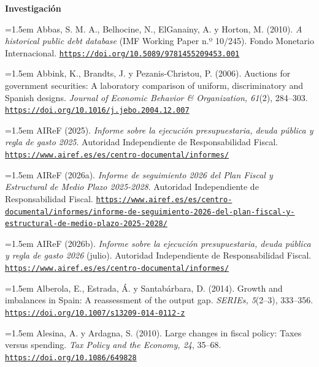 \documentclass[10pt,a4paper]{article}
\begin{document}
\bigskip
{\bfseries\large Investigación\par}
\medskip

\noindent\hangindent=1.5em Abbas, S. M. A., Belhocine, N., ElGanainy, A. y Horton, M. (2010). \textit{A historical public debt database} (IMF Working Paper n.º 10/245). Fondo Monetario Internacional. \href{https://doi.org/10.5089/9781455209453.001}{\nolinkurl{https://doi.org/10.5089/9781455209453.001}}

\noindent\hangindent=1.5em Abbink, K., Brandts, J. y Pezanis-Christou, P. (2006). Auctions for government securities: A laboratory comparison of uniform, discriminatory and Spanish designs. \textit{Journal of Economic Behavior \& Organization, 61}(2), 284--303. \href{https://doi.org/10.1016/j.jebo.2004.12.007}{\nolinkurl{https://doi.org/10.1016/j.jebo.2004.12.007}}

\noindent\hangindent=1.5em AIReF (2025). \textit{Informe sobre la ejecución presupuestaria, deuda pública y regla de gasto 2025}. Autoridad Independiente de Responsabilidad Fiscal. \href{https://www.airef.es/es/centro-documental/informes/}{\nolinkurl{https://www.airef.es/es/centro-documental/informes/}}

\noindent\hangindent=1.5em AIReF (2026a). \textit{Informe de seguimiento 2026 del Plan Fiscal y Estructural de Medio Plazo 2025-2028}. Autoridad Independiente de Responsabilidad Fiscal. \href{https://www.airef.es/es/centro-documental/informes/informe-de-seguimiento-2026-del-plan-fiscal-y-estructural-de-medio-plazo-2025-2028/}{\nolinkurl{https://www.airef.es/es/centro-documental/informes/informe-de-seguimiento-2026-del-plan-fiscal-y-estructural-de-medio-plazo-2025-2028/}}

\noindent\hangindent=1.5em AIReF (2026b). \textit{Informe sobre la ejecución presupuestaria, deuda pública y regla de gasto 2026} (julio). Autoridad Independiente de Responsabilidad Fiscal. \href{https://www.airef.es/es/centro-documental/informes/}{\nolinkurl{https://www.airef.es/es/centro-documental/informes/}}

\noindent\hangindent=1.5em Alberola, E., Estrada, Á. y Santabárbara, D. (2014). Growth and imbalances in Spain: A reassessment of the output gap. \textit{SERIEs, 5}(2--3), 333--356. \href{https://doi.org/10.1007/s13209-014-0112-z}{\nolinkurl{https://doi.org/10.1007/s13209-014-0112-z}}

\noindent\hangindent=1.5em Alesina, A. y Ardagna, S. (2010). Large changes in fiscal policy: Taxes versus spending. \textit{Tax Policy and the Economy, 24}, 35--68. \href{https://doi.org/10.1086/649828}{\nolinkurl{https://doi.org/10.1086/649828}}
\end{document}
